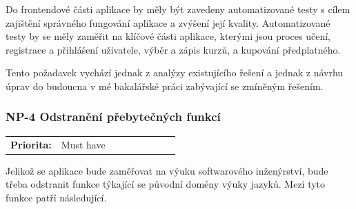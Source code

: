 Do frontendové části aplikace by měly být zavedeny automatizované testy s cílem zajištění správného fungování aplikace a zvýšení její kvality. Automatizované testy by se měly zaměřit na klíčové části aplikace, kterými jsou proces učení, registrace a přihlášení uživatele, výběr a zápis kurzů, a kupování předplatného.

Tento požadavek vychází jednak z analýzy existujícího řešení a jednak z návrhu úprav do budoucna v mé bakalářské práci \cite{Jenicek2024BachelorThesis} zabývající se zmíněným řešením.

\subsubsection{NP-4 Odstranění přebytečných funkcí}

\begin{tabular}{lp{0.7\linewidth}}
    \textbf{Priorita:} & Must have \\
\end{tabular}

Jelikož se aplikace bude zaměřovat na výuku softwarového inženýrství, bude třeba odstranit funkce týkající se původní domény výuky jazyků. Mezi tyto funkce patří následující.

